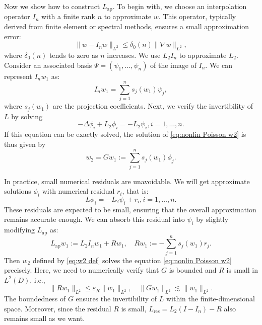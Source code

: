 \documentclass[11pt,a4paper]{article}
\numberwithin{equation}{section}
\newcommand{\assign}{:=}
\newcommand{\tmop}[1]{\ensuremath{\operatorname{#1}}}
\begin{document}
Now we show how to construct $ L_{\tmop{ap}}$. To begin with, we choose an
interpolation operator $I_n$ with a finite rank $n$ to approximate $w$. This
operator, typically derived from finite element or spectral methods, ensures a
small approximation error:
\[ \| w - I_n w \|_{L^2} \leqslant \delta_0 (n) \| \nabla w \|_{L^2},   \]where $\delta_0 (n)$ tends to zero as $n$ increases.
We use $L_2 I_n$ to approximate $L_2$. Consider  an associated basis $\Psi = (\psi_1, \ldots, \psi_n)$ of the image of $I_n$. We can represent
$I_n w_1$ as:
\[ I_n w_1 = \sum_{j = 1}^n s_j (w_1) \psi_j, \]
where $s_j (w_1)$ are the projection coefficients. Next, we verify the
invertibility of $L$ by solving
\[ - \Delta \phi_i + L_2 \phi_i = -L_2 \psi_i, i = 1, \ldots, n. \]
If this equation can be exactly solved, the solution of \eqref{eq:nonlin
Poisson w2} is thus given by
\begin{equation}
  w_2 = G w_1 \assign \sum_{j = 1}^n s_j (w_1) \phi_j . \label{eq:w2 def}
\end{equation}

In practice, small numerical residuals are unavoidable. We will get
approximate solutions $\phi_i$ with numerical residual $r_i$, that is:
\begin{equation*}
  L \phi_i = -L_2 \psi_i + r_i, i = 1, \ldots, n. \label{eq:gk method}
\end{equation*}
These residuals are expected to be
small, ensuring that the overall approximation remains accurate enough. We can
absorb this residual into $\psi_i$ by slightly modifying $L_{\tmop{ap}}$
as:
\begin{equation*}
  L_{\tmop{ap}} w_1 \assign L_2 I_n w_1 + R w_1,\quad R w_1 \assign -\sum_{j
  = 1}^n s_j (w_1) r_j.\label{eq:Lapn tilde def w1}
\end{equation*}
Then $w_2$ defined by \eqref{eq:w2 def} solves the
equation \eqref{eq:nonlin Poisson w2} precisely. Here, we need to numerically
verify that $G$ is bounded and $R$ is small in $L^2 (D)$, i.e.,
\[ \| R w_1 \|_{L^2} \leqslant \varepsilon_R \| w_1 \|_{L^2}, \quad\| G w_1 \|_{L^2}
   \lesssim \| w_1 \|_{L^2} . \]
The boundedness of $G$ ensures the invertibility of $L$ within the
finite-dimensional space. Moreover, since the residual $R$ is small,
$ L_{\tmop{res}} = L_2 (I - I_n) - R$ also remains small as we want.
\end{document}
